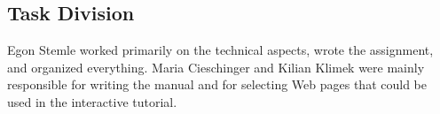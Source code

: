 \documentclass[12pt,a4paper]{article}
\begin{document}
\subsection{Task Division}

Egon Stemle worked primarily on the technical aspects, wrote the assignment, and organized everything. Maria Cieschinger and Kilian Klimek were mainly responsible for writing the manual and for selecting Web pages that could be used in the interactive tutorial.

\nocite{*}

\footnotesize


\normalsize

\newpage
\pagestyle{empty}


\end{document}
